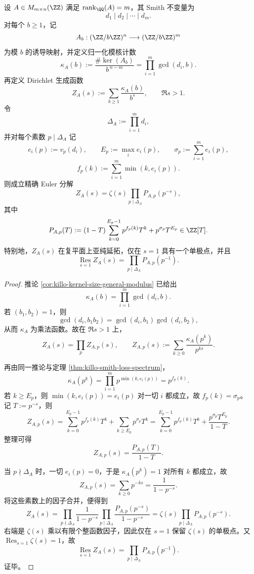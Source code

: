 \begin{theorem}\label{thm:xi-kernel-dirichlet-zeta-finite-euler-correction}
设 \(A\in M_{m\times n}(\ZZ)\) 满足 \(\operatorname{rank}_{\QQ}(A)=m\)，其 Smith 不变量为
\[
d_1\mid d_2\mid\cdots\mid d_m.
\]
对每个 \(b\ge 1\)，记
\[
A_b:(\ZZ/b\ZZ)^n\longrightarrow(\ZZ/b\ZZ)^m
\]
为模 \(b\) 的诱导映射，并定义归一化模核计数
\[
\kappa_A(b):=\frac{\#\ker(A_b)}{b^{\,n-m}}
=
\prod_{i=1}^{m}\gcd(d_i,b).
\]
再定义 Dirichlet 生成函数
\[
Z_A(s):=\sum_{b\ge 1}\frac{\kappa_A(b)}{b^s},
\qquad
\Re s>1.
\]
令
\[
\Delta_A:=\prod_{i=1}^{m}d_i,
\]
并对每个素数 \(p\mid \Delta_A\) 记
\[
e_i(p):=v_p(d_i),\qquad
E_p:=\max_i e_i(p),\qquad
\sigma_p:=\sum_{i=1}^{m}e_i(p),
\]
\[
f_p(k):=\sum_{i=1}^{m}\min(k,e_i(p)).
\]
则成立精确 Euler 分解
\[
Z_A(s)=\zeta(s)\prod_{p\mid \Delta_A}P_{A,p}(p^{-s}),
\]
其中
\[
P_{A,p}(T)
:=
(1-T)\sum_{k=0}^{E_p-1}p^{f_p(k)}T^k
+p^{\sigma_p}T^{E_p}
\in\ZZ[T].
\]
特别地，\(Z_A(s)\) 在复平面上亚纯延拓，仅在 \(s=1\) 具有一个单极点，并且
\[
\operatorname*{Res}_{s=1}Z_A(s)
=
\prod_{p\mid \Delta_A}P_{A,p}(p^{-1}).
\]
\end{theorem}
\begin{proof}
推论 \ref{cor:killo-kernel-size-general-modulus} 已给出
\[
\kappa_A(b)=\prod_{i=1}^{m}\gcd(d_i,b).
\]
若 \((b_1,b_2)=1\)，则
\[
\gcd(d_i,b_1b_2)=\gcd(d_i,b_1)\gcd(d_i,b_2),
\]
从而 \(\kappa_A\) 为乘法函数。故在 \(\Re s>1\) 上，
\[
Z_A(s)=\prod_{p}Z_{A,p}(s),
\qquad
Z_{A,p}(s):=\sum_{k\ge 0}\frac{\kappa_A(p^k)}{p^{ks}}.
\]

再由同一推论与定理 \ref{thm:killo-smith-loss-spectrum}，
\[
\kappa_A(p^k)=\prod_{i=1}^{m}p^{\min(k,e_i(p))}=p^{f_p(k)}.
\]
若 \(k\ge E_p\)，则 \(\min(k,e_i(p))=e_i(p)\) 对一切 \(i\) 都成立，故 \(f_p(k)=\sigma_p\)。记 \(T:=p^{-s}\)，则
\[
Z_{A,p}(s)
=
\sum_{k=0}^{E_p-1}p^{f_p(k)}T^k+\sum_{k\ge E_p}p^{\sigma_p}T^k
=
\sum_{k=0}^{E_p-1}p^{f_p(k)}T^k+\frac{p^{\sigma_p}T^{E_p}}{1-T}.
\]
整理可得
\[
Z_{A,p}(s)=\frac{P_{A,p}(T)}{1-T}.
\]

当 \(p\nmid \Delta_A\) 时，一切 \(e_i(p)=0\)，于是 \(\kappa_A(p^k)=1\) 对所有 \(k\) 都成立，故
\[
Z_{A,p}(s)=\sum_{k\ge 0}p^{-ks}=\frac{1}{1-p^{-s}}.
\]
将这些素数上的因子合并，便得到
\[
Z_A(s)
=
\prod_{p\nmid \Delta_A}\frac{1}{1-p^{-s}}
\prod_{p\mid \Delta_A}\frac{P_{A,p}(p^{-s})}{1-p^{-s}}
=
\zeta(s)\prod_{p\mid \Delta_A}P_{A,p}(p^{-s}).
\]
右端是 \(\zeta(s)\) 乘以有限个整函数因子，因此仅在 \(s=1\) 保留 \(\zeta(s)\) 的单极点。又 \(\operatorname*{Res}_{s=1}\zeta(s)=1\)，故
\[
\operatorname*{Res}_{s=1}Z_A(s)
=
\prod_{p\mid \Delta_A}P_{A,p}(p^{-1}).
\]
证毕。
\end{proof}

